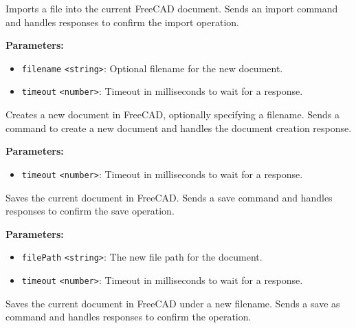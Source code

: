\documentclass[12pt,a4paper]{article}
\begin{document}
\noindent Imports a file into the current FreeCAD document.
Sends an import command and handles responses to confirm the import operation.

\vspace{5mm}
\noindent {}


\noindent \textbf{Parameters:}
\begin{itemize}
  \item \texttt{filename} \texttt{<string>}: Optional filename for the new document.
  \item \texttt{timeout} \texttt{<number>}: Timeout in milliseconds to wait for a response.
\end{itemize}

\noindent Creates a new document in FreeCAD, optionally specifying a filename.
Sends a command to create a new document and handles the document creation response.

\vspace{5mm}
\noindent {}


\noindent \textbf{Parameters:}
\begin{itemize}
  \item \texttt{timeout} \texttt{<number>}: Timeout in milliseconds to wait for a response.
\end{itemize}

\noindent Saves the current document in FreeCAD.
Sends a save command and handles responses to confirm the save operation.

\vspace{5mm}
\noindent {}


\noindent \textbf{Parameters:}
\begin{itemize}
  \item \texttt{filePath} \texttt{<string>}: The new file path for the document.
  \item \texttt{timeout} \texttt{<number>}: Timeout in milliseconds to wait for a response.
\end{itemize}

\noindent Saves the current document in FreeCAD under a new filename.
Sends a save as command and handles responses to confirm the operation.
\end{document}
